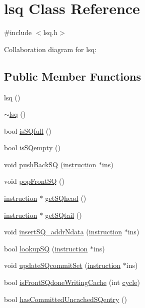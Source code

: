 \hypertarget{classlsq}{
\section{lsq Class Reference}
\label{classlsq}
}


{\ttfamily \#include $<$lsq.h$>$}



Collaboration diagram for lsq:
\subsection*{Public Member Functions}
\begin{DoxyCompactItemize}
\item 
\hyperlink{classlsq_a7404da6835aa5321a2a5a074b314e944}{lsq} ()
\item 
\hyperlink{classlsq_a430a385f670bea75213f5be7ea0891e4}{$\sim$lsq} ()
\item 
bool \hyperlink{classlsq_afc76def93e0f2ac0c56a92e1dc8d7efd}{isSQfull} ()
\item 
bool \hyperlink{classlsq_a9f240390c165b00ead843f037ab28262}{isSQempty} ()
\item 
void \hyperlink{classlsq_a9a3ea7ed05bbcf12b332a18fc84a317a}{pushBackSQ} (\hyperlink{classinstruction}{instruction} $\ast$ins)
\item 
void \hyperlink{classlsq_aca2f5a9e6e6c483b11eec879cda2100e}{popFrontSQ} ()
\item 
\hyperlink{classinstruction}{instruction} $\ast$ \hyperlink{classlsq_ac9a2a8f09749bd97d5ae525cffbdbda9}{getSQhead} ()
\item 
\hyperlink{classinstruction}{instruction} $\ast$ \hyperlink{classlsq_a286e28a30ce1b7752d5ce9eb0f77d6ae}{getSQtail} ()
\item 
void \hyperlink{classlsq_a9a1d52c28adf6f9b59a82b876a29af53}{insertSQ\_\-addrNdata} (\hyperlink{classinstruction}{instruction} $\ast$ins)
\item 
bool \hyperlink{classlsq_ab0f9350bede75f5dd0f46abd71a3fc20}{lookupSQ} (\hyperlink{classinstruction}{instruction} $\ast$ins)
\item 
void \hyperlink{classlsq_aa78ff1e0d38eabd68022968e8cd31c5d}{updateSQcommitSet} (\hyperlink{classinstruction}{instruction} $\ast$ins)
\item 
bool \hyperlink{classlsq_a4eddb5e00ca783798e83971c467e6017}{isFrontSQdoneWritingCache} (int \hyperlink{vliwScheduler_8cpp_a1f4871d45089b039d95d3832dd123827}{cycle})
\item 
bool \hyperlink{classlsq_a93b8919385546da53590c68cb739838e}{hasCommittedUncachedSQentry} ()

\end{DoxyCompactItemize}
